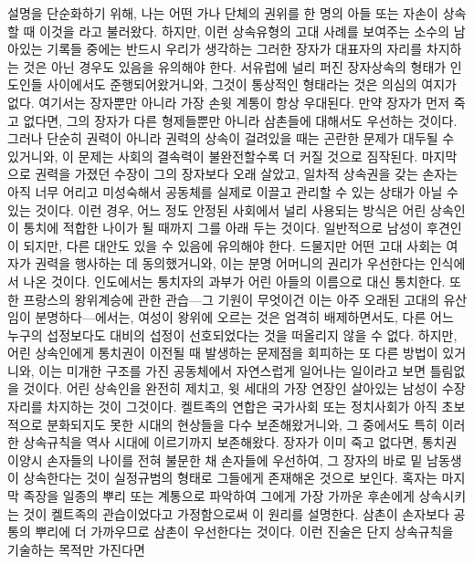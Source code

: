 설명을 단순화하기 위해,
나는
어떤 가나 단체의 권위를
한 명의 아들 또는 자손이
상속할 때
이것을 라고 불러왔다.
하지만,
이런 상속유형의 고대 사례를 보여주는 소수의 남아있는 기록들 중에는
반드시 우리가 생각하는 그러한 장자가 대표자의 자리를 차지하는 것은
아닌 경우도 있음을 유의해야 한다.
서유럽에 널리 퍼진 장자상속의 형태가 인도인들 사이에서도 준행되어왔거니와,
그것이 통상적인 형태라는 것은 의심의 여지가 없다.
여기서는 장자뿐만 아니라 가장 손윗 계통이 항상 우대된다.
만약 장자가 먼저 죽고 없다면, 그의 장자가 다른 형제들뿐만 아니라
삼촌들에 대해서도 우선하는 것이다.
그러나 단순히  권력이 아니라  권력의 상속이
걸려있을 때는 곤란한 문제가 대두될 수 있거니와,
이 문제는 사회의 결속력이 불완전할수록 더 커질 것으로 짐작된다.
마지막으로 권력을 가졌던 수장이 그의 장자보다 오래 살았고,
일차적 상속권을 갖는
손자는 아직 너무 어리고 미성숙해서
공동체를 실제로 이끌고 관리할 수 있는 상태가 아닐 수 있는 것이다.
이런 경우, 어느 정도 안정된 사회에서 널리 사용되는 방식은
어린 상속인이 통치에 적합한 나이가 될 때까지 그를  아래 두는 것이다.
일반적으로  남성이 후견인이 되지만,
다른 대안도 있을 수 있음에 유의해야 한다.
드물지만 어떤 고대 사회는 여자가 권력을 행사하는 데 동의했거니와,
이는 분명 어머니의 권리가 우선한다는 인식에서 나온 것이다.
인도에서는 통치자의 과부가 어린 아들의 이름으로 대신 통치한다.
또한 프랑스의 왕위계승에 관한 관습---그 기원이 무엇이건 이는
아주 오래된 고대의 유산임이 분명하다---에서는,
여성이 왕위에 오르는 것은 엄격히 배제하면서도,
다른 어느 누구의 섭정보다도
대비의 섭정이
선호되었다는 것을
떠올리지 않을 수 없다.
하지만, 어린 상속인에게 통치권이 이전될 때 발생하는 문제점을 회피하는
또 다른 방법이 있거니와, 이는 미개한 구조를 가진 공동체에서
자연스럽게 일어나는 일이라고 보면 틀림없을 것이다.
어린 상속인을 완전히 제치고,
윗 세대의 가장 연장인 살아있는 남성이
수장 자리를 차지하는 것이 그것이다.
켈트족의 연합은
국가사회 또는 정치사회가 아직 초보적으로 분화되지도 못한 시대의
현상들을 다수 보존해왔거니와,
그 중에서도 특히
이러한 상속규칙을 역사 시대에 이르기까지 보존해왔다.
장자가 이미 죽고 없다면,
통치권 이양시 손자들의 나이를 전혀 불문한 채
손자들에 우선하여,
그 장자의 바로 밑 남동생이
상속한다는 것이
실정규범의 형태로 그들에게 존재해온 것으로 보인다.
혹자는
마지막 족장을 일종의 뿌리 또는 계통으로 파악하여
그에게 가장 가까운 후손에게 상속시키는 것이 켈트족의 관습이었다고
가정함으로써 이 원리를
설명한다.
삼촌이
손자보다
공통의 뿌리에 더 가까우므로 삼촌이 우선한다는 것이다.
이런 진술은 단지 상속규칙을 기술하는 목적만 가진다면
